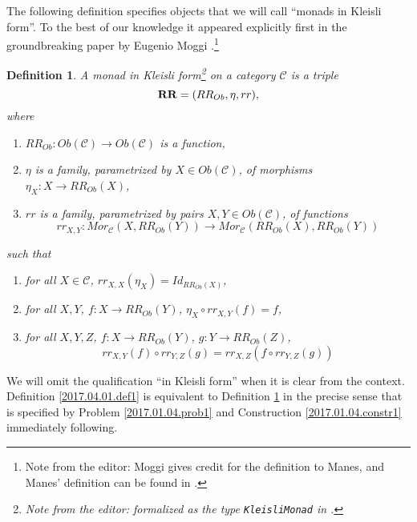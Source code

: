 \documentclass[onecolumn,12pt]{amsart}
\newtheorem{definition}[proposition]{Definition}
\numberwithin{proposition}{subsection}
\newcommand{\sr}{\rightarrow}
\newcommand{\RR}{{\bf RR}}
\newcommand{\C}{{\mathcal C}}
\newcommand{\editorfootnote}[1]{\footnote{Note from the editor: #1}}
\begin{document}
The following definition specifies objects that we will call ``monads in
Kleisli form''. To the best of our knowledge it appeared explicitly first
in the groundbreaking paper by Eugenio Moggi \cite{Moggi}.\editorfootnote{Moggi \cite[Definition 1.2 and Proposition 1.6]{Moggi91} gives credit for the
  definition to Manes, and Manes' definition can be found in \cite[exercise 12, page 32]{Manes}.}
%
\begin{definition}
\label{2017.04.13.def1}
A {\em monad in Kleisli form}\editorfootnote{formalized as the type {\tt KleisliMonad} in \cite{UniMath}.} on a category $\C$ is a triple $$\RR=(RR_{Ob},\eta,rr),$$ where 
%
\begin{enumerate}
\item \label{2017.04.19.eq1} $RR_{Ob}:Ob(\C)\sr Ob(\C)$ is a function,
\item \label{2017.04.19.eq2} $\eta$ is a family, parametrized by $X\in Ob(\C)$, of morphisms $\eta_X:X\sr RR_{Ob}(X)$,
\item \label{2017.04.19.eq3} $rr$ is a family, parametrized by pairs $X,Y\in Ob(\C)$, of functions 
%
$$rr_{X,Y}:Mor_{\C}(X,RR_{Ob}(Y))\sr Mor_{\C}(RR_{Ob}(X),RR_{Ob}(Y))$$
%
\end{enumerate}
%
such that
%
\begin{enumerate}[resume]
\item \label{2017.04.19.eq4} for all $X\in\C$, $rr_{X,X}(\eta_X)=Id_{RR_{Ob}(X)}$,
\item \label{2017.04.19.eq5} for all $X,Y$, $f:X\sr RR_{Ob}(Y)$, $\eta_X\circ rr_{X,Y}(f)=f$,
\item \label{2017.04.19.eq6} for all $X,Y,Z$, $f:X\sr RR_{Ob}(Y)$, $g:Y\sr RR_{Ob}(Z)$, 
%
$$rr_{X,Y}(f)\circ rr_{Y,Z}(g)=rr_{X,Z}(f\circ rr_{Y,Z}(g))$$
%
\end{enumerate}
\end{definition}
%
We will omit the qualification ``in Kleisli form'' when it is clear from the context. 
Definition \ref{2017.04.01.def1} is equivalent to Definition \ref{2017.04.13.def1} in the precise sense that is specified by Problem \ref{2017.01.04.prob1} and Construction \ref{2017.01.04.constr1} immediately following. 
%
\end{document}

